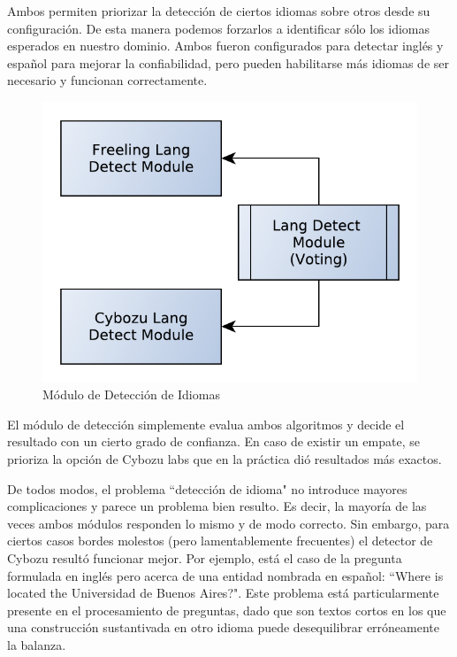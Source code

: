 Ambos permiten priorizar la detección de ciertos idiomas sobre otros desde su configuración.
De esta manera podemos forzarlos a identificar sólo los idiomas esperados en nuestro dominio. 
Ambos fueron configurados para detectar inglés y español para mejorar la confiabilidad,
pero pueden habilitarse más idiomas de ser necesario y funcionan correctamente. 

\begin{figure}
  \centering
    \includegraphics[scale=0.5]{graficos/LangDetect}
  \caption{Módulo de Detección de Idiomas}
  \label{fig:LangDetect}
\end{figure}


El módulo de detección simplemente evalua ambos algoritmos y 
decide el resultado con un cierto grado de confianza. En caso de existir un empate, se 
prioriza la opción de Cybozu labs que en la práctica dió resultados más exactos.

De todos modos, el problema ``detección de idioma" no introduce mayores complicaciones y parece un problema bien resulto.
Es decir, la mayoría de las veces ambos módulos responden lo mismo y de modo correcto.
Sin embargo, para ciertos casos bordes molestos (pero lamentablemente frecuentes)
el detector de Cybozu resultó funcionar mejor. Por ejemplo, está el caso de la pregunta formulada en inglés pero acerca de una entidad nombrada en español: 
``Where is located the Universidad de Buenos Aires?". Este problema está particularmente presente en el procesamiento de preguntas, dado que son textos cortos en los que una construcción sustantivada en otro idioma puede desequilibrar erróneamente la balanza. 

